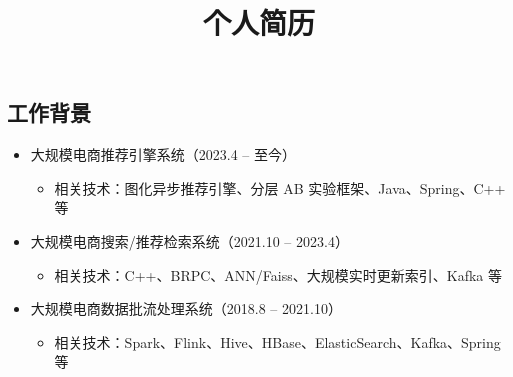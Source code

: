 \documentclass[12pt,a4paper,sans]{moderncv}   %
\title{个人简历}                     %
\begin{document}
\begin{CJK}{UTF8}{gkai}                       %
\maketitle


\section{工作背景}

\begin{itemize}
	\item 大规模电商推荐引擎系统（2023.4 -- 至今）
	\begin{itemize}
		\item 相关技术：图化异步推荐引擎、分层 AB 实验框架、Java、Spring、C++ 等
	\end{itemize}
	\item 大规模电商搜索/推荐检索系统（2021.10 -- 2023.4）
	\begin{itemize}
		\item 相关技术：C++、BRPC、ANN/Faiss、大规模实时更新索引、Kafka 等
	\end{itemize}
	\item 大规模电商数据批流处理系统（2018.8 -- 2021.10）
	\begin{itemize}
		\item 相关技术：Spark、Flink、Hive、HBase、ElasticSearch、Kafka、Spring 等
	\end{itemize}
\end{itemize}


\end{CJK}
\end{document}
